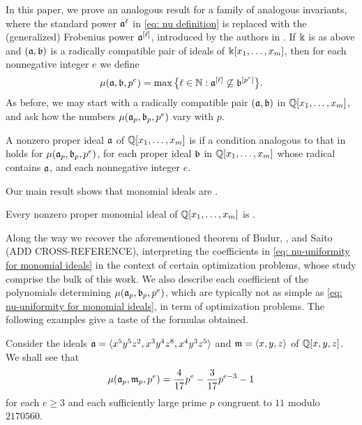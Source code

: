 \documentclass{amsart}
\begin{document}
In this paper, we prove an analogous result for a family of analogous invariants, where the standard power $\mathfrak{a}^\ell$ in \eqref{eq: nu definition} is replaced with the (generalized) Frobenius power $\mathfrak{a}^{[\ell]}$, introduced by the authors in \cite{hernandez+etal.frobenius_powers}.
If $\Bbbk$ is as above and $(\mathfrak{a},\mathfrak{b})$ is a radically compatible pair of ideals of $\Bbbk[x_1, \ldots, x_m]$, then for each nonnegative integer $e$ we define
\[\mu(\mathfrak{a},\mathfrak{b},p^e) = \max\big\{\ell\in \mathbb{N} : \mathfrak{a}^{[\ell]} \not\subseteq \mathfrak{b}^{[p^e]}\big\}.\]
As before, we may start with a radically compatible pair $(\mathfrak{a},\mathfrak{b})$ in $\mathbb{Q}[x_1,\ldots,x_m]$, and ask how the numbers $\mu(\mathfrak{a}_p,\mathfrak{b}_p,p^e)$ vary with $p$.

\begin{definition}
   \label{defn: muCool}
   A nonzero proper ideal $\mathfrak{a}$ of $\mathbb{Q}[x_1,\ldots,x_m]$ is \emph{\muCool} if a condition analogous to that in 
   holds for $\mu(\mathfrak{a}_p,\mathfrak{b}_p,p^e)$, for each proper ideal $\mathfrak{b}$ in $\mathbb{Q}[x_1,\ldots,x_m]$ whose radical contains $\mathfrak{a}$, and each nonnegative integer $e$.
\end{definition}

Our main result shows that monomial ideals are \muCool.
\begin{thmintro}[\textcolor{nicered}{ADD CROSS-REFERENCE}]
   \label{main theorem}
   Every nonzero proper monomial ideal of $\mathbb{Q}[x_1,\ldots,x_m]$ is \muCool.
\end{thmintro}

Along the way we recover the aforementioned theorem of Budur, \mustata, and Saito \textcolor{nicered}{(ADD CROSS-REFERENCE)}, interpreting the coefficients in \eqref{eq: nu-uniformity for monomial ideals} in the context of certain optimization problems, whose study comprise the bulk of this work. 
We also describe each coefficient of the polynomials determining $\mu(\mathfrak{a}_p,\mathfrak{b}_p,p^e)$, which are typically not as simple as \eqref{eq: nu-uniformity for monomial ideals}, in term of optimization problems.
The following examples give a taste of the formulas obtained.

\begin{example}
   \label{ex1 intro}
   Consider the ideals $\mathfrak{a} = \langle x^5 y^5 z^2, x^3 y^4 z^8, x^4 y^3 z^5 \rangle$ and $\mathfrak{m} = \langle x,y,z \rangle$ of $\mathbb{Q}[x,y,z]$.
   We shall see that
   \[
      \mu(\mathfrak{a}_p,\mathfrak{m}_p,p^e) = \frac{4}{17}p^e - \frac{3}{17}p^{e-3}  - 1
    \]
    for each $e\ge 3$ and each sufficiently large prime $p$ congruent to $11$ modulo $\num{2170560}$.
\end{example}
\end{document}
